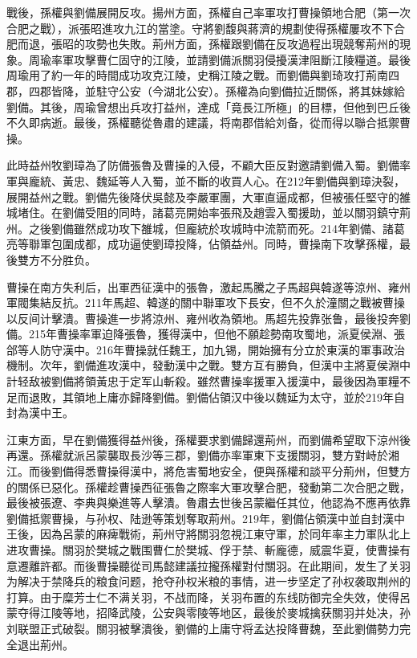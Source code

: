 戰後，孫權與劉備展開反攻。揚州方面，孫權自己率軍攻打曹操領地合肥（第一次合肥之戰），派張昭進攻九江的當塗。守將劉馥與蔣濟的規劃使得孫權屢攻不下合肥而退，張昭的攻勢也失敗。荊州方面，孫權跟劉備在反攻過程出現競奪荊州的現象。周瑜率軍攻擊曹仁固守的江陵，並請劉備派關羽侵擾漢津阻斷江陵糧道。最後周瑜用了約一年的時間成功攻克江陵，史稱江陵之戰。而劉備與劉琦攻打荊南四郡，四郡皆降，並駐守公安（今湖北公安）。孫權為向劉備拉近關係，將其妹嫁給劉備。其後，周瑜曾想出兵攻打益州，達成「竟長江所極」的目標，但他到巴丘後不久即病逝。最後，孫權聽從魯肅的建議，将南郡借給刘备，從而得以聯合抵禦曹操。

此時益州牧劉璋為了防備張魯及曹操的入侵，不顧大臣反對邀請劉備入蜀。劉備率軍與龐統、黃忠、魏延等人入蜀，並不斷的收買人心。在212年劉備與劉璋決裂，展開益州之戰。劉備先後降伏吳懿及李嚴軍團，大軍直逼成都，但被張任堅守的雒城堵住。在劉備受阻的同時，諸葛亮開始率張飛及趙雲入蜀援助，並以關羽鎮守荊州。之後劉備雖然成功攻下雒城，但龐統於攻城時中流箭而死。214年劉備、諸葛亮等聯軍包圍成都，成功逼使劉璋投降，佔領益州。同時，曹操南下攻擊孫權，最後雙方不分胜负。

曹操在南方失利后，出軍西征漢中的張魯，激起馬騰之子馬超與韓遂等涼州、雍州軍閥集結反抗。211年馬超、韓遂的關中聯軍攻下長安，但不久於潼關之戰被曹操以反间计擊潰。曹操進一步將涼州、雍州收為領地。馬超先投靠张鲁，最後投奔劉備。215年曹操率軍迫降張魯，獲得漢中，但他不願趁勢南攻蜀地，派夏侯淵、張郃等人防守漢中。216年曹操就任魏王，加九锡，開始擁有分立於東漢的軍事政治機制。次年，劉備進攻漢中，發動漢中之戰。雙方互有勝負，但漢中主將夏侯淵中計轻敌被劉備將領黃忠于定军山斬殺。雖然曹操率援軍入援漢中，最後因為軍糧不足而退敗，其領地上庸亦歸降劉備。劉備佔領汉中後以魏延为太守，並於219年自封為漢中王。

江東方面，早在劉備獲得益州後，孫權要求劉備歸還荊州，而劉備希望取下涼州後再還。孫權就派呂蒙襲取長沙等三郡，劉備亦率軍東下支援關羽，雙方對峙於湘江。而後劉備得悉曹操得漢中，將危害蜀地安全，便與孫權和談平分荊州，但雙方的關係已惡化。孫權趁曹操西征張魯之際率大軍攻擊合肥，發動第二次合肥之戰，最後被張遼、李典與樂進等人擊潰。魯肅去世後呂蒙繼任其位，他認為不應再依靠劉備抵禦曹操，与孙权、陆逊等策划奪取荊州。219年，劉備佔領漢中並自封漢中王後，因為呂蒙的麻痺戰術，荊州守將關羽忽視江東守軍，於同年率主力軍队北上进攻曹操。關羽於樊城之戰围曹仁於樊城、俘于禁、斬龐德，威震华夏，使曹操有意遷離許都。而後曹操聽從司馬懿建議拉攏孫權對付關羽。在此期间，发生了关羽为解决于禁降兵的粮食问题，抢夺孙权米粮的事情，进一步坚定了孙权袭取荆州的打算。由于糜芳士仁不满关羽，不战而降，关羽布置的东线防御完全失效，使得呂蒙夺得江陵等地，招降武陵，公安與零陵等地区，最後於麥城擒获關羽并处决，孙刘联盟正式破裂。關羽被擊潰後，劉備的上庸守将孟达投降曹魏，至此劉備勢力完全退出荊州。

